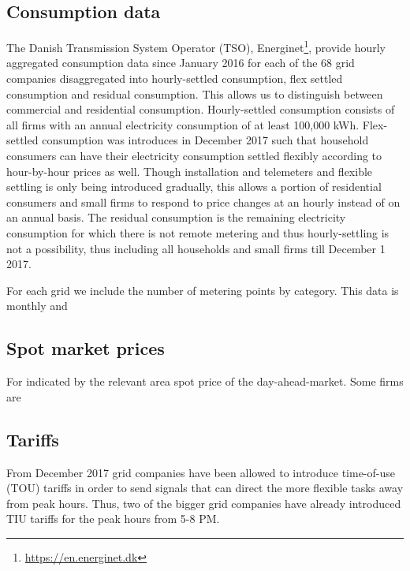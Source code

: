 \label{sec:data}
\subsection{Consumption data}
\label{subsec:data_consumption}
The Danish Transmission System Operator (TSO), Energinet\footnote{\url{https://en.energinet.dk}}, provide hourly aggregated consumption data since January 2016 for each of the 68 grid companies disaggregated into hourly-settled consumption, flex settled consumption and residual consumption. This allows us to distinguish between commercial and residential consumption. Hourly-settled consumption consists of all firms with an annual electricity consumption of at least 100,000 kWh. Flex-settled consumption was introduces in December 2017 such that household consumers can have their electricity consumption settled flexibly according to hour-by-hour prices as well. Though installation and telemeters and flexible settling is only being introduced gradually, this allows a portion of residential consumers and small firms to respond to price changes at an hourly instead of on an annual basis. The residual consumption is the remaining electricity consumption for which there is not remote metering and thus hourly-settling is not a possibility, thus including all households and small firms till December 1 2017.
\par
For each grid we include the number of metering points by category. This data is monthly and



\subsection{Spot market prices}
\label{subsec:data_spot}
For  indicated by the relevant area spot price of the day-ahead-market. Some firms are


\subsection{Tariffs}
From December 2017 grid companies have been allowed to introduce time-of-use (TOU) tariffs in order to send signals that can direct the more flexible tasks away from peak hours. Thus, two of the bigger grid companies have already introduced TIU tariffs for the peak hours from 5-8 PM.


